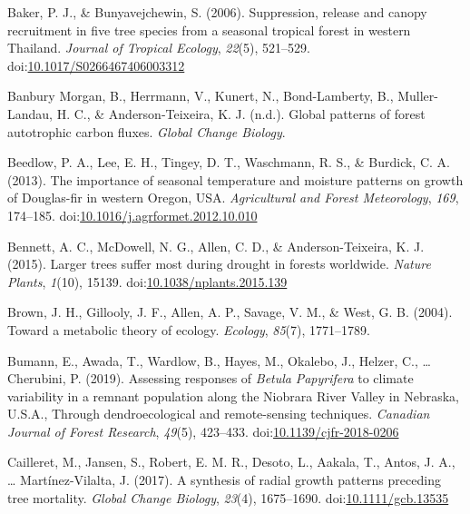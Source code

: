 \documentclass[
]{article}
\newlength{\cslhangindent}
\newenvironment{cslreferences}%
  {\setlength{\parindent}{0pt}%
  \everypar{\setlength{\hangindent}{\cslhangindent}}\ignorespaces}%
  {\par}
\begin{document}
\begin{cslreferences}
\leavevmode\hypertarget{ref-baker_suppression_2006}{}%
Baker, P. J., \& Bunyavejchewin, S. (2006). Suppression, release and
canopy recruitment in five tree species from a seasonal tropical forest
in western Thailand. \emph{Journal of Tropical Ecology}, \emph{22}(5),
521--529.
doi:\href{https://doi.org/10.1017/S0266467406003312}{10.1017/S0266467406003312}

\leavevmode\hypertarget{ref-banbury_morgan_global_nodate}{}%
Banbury Morgan, B., Herrmann, V., Kunert, N., Bond-Lamberty, B.,
Muller-Landau, H. C., \& Anderson-Teixeira, K. J. (n.d.). Global
patterns of forest autotrophic carbon fluxes. \emph{Global Change
Biology}.

\leavevmode\hypertarget{ref-beedlow_importance_2013}{}%
Beedlow, P. A., Lee, E. H., Tingey, D. T., Waschmann, R. S., \& Burdick,
C. A. (2013). The importance of seasonal temperature and moisture
patterns on growth of Douglas-fir in western Oregon, USA.
\emph{Agricultural and Forest Meteorology}, \emph{169}, 174--185.
doi:\href{https://doi.org/10.1016/j.agrformet.2012.10.010}{10.1016/j.agrformet.2012.10.010}

\leavevmode\hypertarget{ref-bennett_larger_2015}{}%
Bennett, A. C., McDowell, N. G., Allen, C. D., \& Anderson-Teixeira, K.
J. (2015). Larger trees suffer most during drought in forests worldwide.
\emph{Nature Plants}, \emph{1}(10), 15139.
doi:\href{https://doi.org/10.1038/nplants.2015.139}{10.1038/nplants.2015.139}

\leavevmode\hypertarget{ref-brown_toward_2004}{}%
Brown, J. H., Gillooly, J. F., Allen, A. P., Savage, V. M., \& West, G.
B. (2004). Toward a metabolic theory of ecology. \emph{Ecology},
\emph{85}(7), 1771--1789.

\leavevmode\hypertarget{ref-bumann_assessing_2019}{}%
Bumann, E., Awada, T., Wardlow, B., Hayes, M., Okalebo, J., Helzer, C.,
\ldots{} Cherubini, P. (2019). Assessing responses of \emph{Betula}
\emph{Papyrifera} to climate variability in a remnant population along
the Niobrara River Valley in Nebraska, U.S.A., Through dendroecological
and remote-sensing techniques. \emph{Canadian Journal of Forest
Research}, \emph{49}(5), 423--433.
doi:\href{https://doi.org/10.1139/cjfr-2018-0206}{10.1139/cjfr-2018-0206}

\leavevmode\hypertarget{ref-cailleret_synthesis_2017}{}%
Cailleret, M., Jansen, S., Robert, E. M. R., Desoto, L., Aakala, T.,
Antos, J. A., \ldots{} Martínez-Vilalta, J. (2017). A synthesis of
radial growth patterns preceding tree mortality. \emph{Global Change
Biology}, \emph{23}(4), 1675--1690.
doi:\href{https://doi.org/10.1111/gcb.13535}{10.1111/gcb.13535}


\end{cslreferences}
\end{document}
